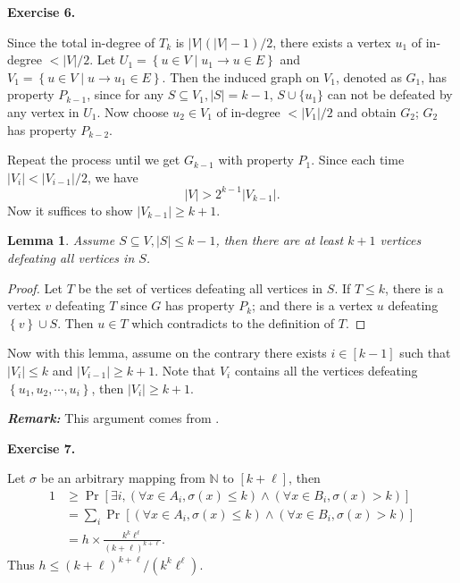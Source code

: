 \documentclass[a4paper]{article}
\newtheorem{lemma}{Lemma}
\newtheorem*{proof}{Proof}
\newenvironment{exercise}[1]{
	\par
	\noindent\textbf{Exercise #1.}\quad
}{
	\par
	\bigskip
}
\newcommand{\pbra}[1]{\left( #1 \right)}
\newcommand{\cbra}[1]{\left\{ #1 \right\}}
\newcommand{\sbra}[1]{\left[ #1 \right]}
\newcommand{\Nbb}{\mathbb{N}}
\begin{document}
\begin{exercise}{6}
    Since the total in-degree of $T_k$ is $|V|(|V|-1)/2$, there exists a vertex $u_1$ of in-degree $<|V|/2$.
    Let $U_1=\cbra{u\in V\middle|u_1\to u\in E}$ and $V_1=\cbra{u\in V\middle|u\to u_1\in E}$.
    Then the induced graph on $V_1$, denoted as $G_1$, has property $P_{k-1}$, 
    since for any $S\subseteq V_1,|S|=k-1$, $S\cup\{u_1\}$ can not be defeated by any vertex in $U_1$.
    Now choose $u_2\in V_1$ of in-degree $<|V_1|/2$ and obtain $G_2$; $G_2$ has property $P_{k-2}$.
    
    Repeat the process until we get $G_{k-1}$ with property $P_1$. Since each time $|V_i|<|V_{i-1}|/2$, we have
    $$
    |V|>2^{k-1}|V_{k-1}|.
    $$ 
    Now it suffices to show $|V_{k-1}|\geq k+1$. 
    \begin{lemma}
        Assume $S\subseteq V,|S|\leq k-1$, then there are at least $k+1$ vertices defeating all vertices in $S$.
    \end{lemma}
    \begin{proof}
        Let $T$ be the set of vertices defeating all vertices in $S$. If $T\leq k$, there is a vertex $v$ defeating $T$
        since $G$ has property $P_k$; and there is a vertex $u$ defeating $\cbra{v}\cup S$. Then $u\in T$ which contradicts to
        the definition of $T$.
    \end{proof}

    Now with this lemma, assume on the contrary there exists $i\in[k-1]$ such that $|V_i|\leq k$ and $|V_{i-1}|\geq k+1$.
    Note that $V_i$ contains all the vertices defeating $\cbra{u_1,u_2,\cdots,u_i}$, then $|V_i|\geq k+1$.
\end{exercise}
\noindent\textbf{\it Remark:} This argument comes from \cite{szekeres1965problem}.

\begin{exercise}{7}
    Let $\sigma$ be an arbitrary mapping from $\Nbb$ to $[k+\ell]$, then
    \begin{align*}
        1&\geq\Pr\sbra{\exists i,\pbra{\forall x\in A_i,\sigma(x)\leq k}\land\pbra{\forall x\in B_i,\sigma(x)>k}}\\
        &=\sum_i\Pr\sbra{\pbra{\forall x\in A_i,\sigma(x)\leq k}\land\pbra{\forall x\in B_i,\sigma(x)>k}}\\
        &=h\times\frac{k^k\ell^\ell}{(k+\ell)^{k+\ell}}.
    \end{align*}
    Thus $h\leq(k+\ell)^{k+\ell}/(k^k\ell^\ell)$.
\end{exercise}
\end{document}
